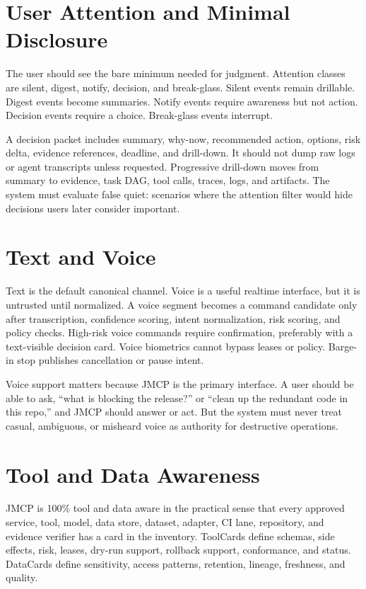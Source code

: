 \documentclass[10pt,journal,onecolumn]{IEEEtran}
\begin{document}
\section{User Attention and Minimal Disclosure}
The user should see the bare minimum needed for judgment. Attention classes are silent, digest, notify, decision, and break-glass. Silent events remain drillable. Digest events become summaries. Notify events require awareness but not action. Decision events require a choice. Break-glass events interrupt.

A decision packet includes summary, why-now, recommended action, options, risk delta, evidence references, deadline, and drill-down. It should not dump raw logs or agent transcripts unless requested. Progressive drill-down moves from summary to evidence, task DAG, tool calls, traces, logs, and artifacts. The system must evaluate false quiet: scenarios where the attention filter would hide decisions users later consider important.

\section{Text and Voice}
Text is the default canonical channel. Voice is a useful realtime interface, but it is untrusted until normalized. A voice segment becomes a command candidate only after transcription, confidence scoring, intent normalization, risk scoring, and policy checks. High-risk voice commands require confirmation, preferably with a text-visible decision card. Voice biometrics cannot bypass leases or policy. Barge-in stop publishes cancellation or pause intent.

Voice support matters because JMCP is the primary interface. A user should be able to ask, ``what is blocking the release?'' or ``clean up the redundant code in this repo,'' and JMCP should answer or act. But the system must never treat casual, ambiguous, or misheard voice as authority for destructive operations.

\section{Tool and Data Awareness}
JMCP is 100\% tool and data aware in the practical sense that every approved service, tool, model, data store, dataset, adapter, CI lane, repository, and evidence verifier has a card in the inventory. ToolCards define schemas, side effects, risk, leases, dry-run support, rollback support, conformance, and status. DataCards define sensitivity, access patterns, retention, lineage, freshness, and quality.
\end{document}
